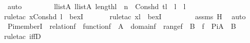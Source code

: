 \begin{isabellebody}
\ auto\ \isanewline
\ \ \ \ \isamarkupfalse%
\ \isamarkupfalse%
\ {\isachardoublequoteopen}{\isasymexists}l{}{\isasymin}list{\isacharparenleft}{\kern0pt}A{\isacharparenright}{\kern0pt}{\isachardot}{\kern0pt}\ {\isasymexists}l{}{\isasymin}list{\isacharparenleft}{\kern0pt}A{\isacharparenright}{\kern0pt}{\isachardot}{\kern0pt}\ length{\isacharparenleft}{\kern0pt}l{}{\isacharparenright}{\kern0pt}\ {\isacharequal}{\kern0pt}\ n\ {\isasymand}\ Cons{\isacharparenleft}{\kern0pt}hd{\isacharcomma}{\kern0pt}\ tl{\isacharparenright}{\kern0pt}\ {\isacharequal}{\kern0pt}\ l{}\ {\isacharat}{\kern0pt}\ l{}{\isachardoublequoteclose}\ \isanewline
\ \ \ \ \ \ \isamarkupfalse%
{\isacharparenleft}{\kern0pt}rule{\isacharunderscore}{\kern0pt}tac\ x{\isacharequal}{\kern0pt}{\isachardoublequoteopen}Cons{\isacharparenleft}{\kern0pt}hd{\isacharcomma}{\kern0pt}\ l{}{\isacharparenright}{\kern0pt}{\isachardoublequoteclose}\ \ bexI{\isacharparenright}{\kern0pt}\isanewline
\ \ \ \ \ \ \isamarkupfalse%
{\isacharparenleft}{\kern0pt}rule{\isacharunderscore}{\kern0pt}tac\ x{\isacharequal}{\kern0pt}l{}\ \ bexI{\isacharparenright}{\kern0pt}\ \isanewline
\ \ \ \ \ \ \isamarkupfalse%
\ assms{}\ H\ \isamarkupfalse%
\ auto\ \isanewline
\ \ \isamarkupfalse%
\isanewline
{}\isamarkupfalse%
%
\endisatagproof
{\isafoldproof}%
%
\isadelimproof
\isanewline
%
\endisadelimproof
\isanewline
{}\isamarkupfalse%
\ Pi{\isacharunderscore}{\kern0pt}memberI\ {\isacharcolon}{\kern0pt}\ {\isachardoublequoteopen}relation{\isacharparenleft}{\kern0pt}f{\isacharparenright}{\kern0pt}\ {\isasymLongrightarrow}\ function{\isacharparenleft}{\kern0pt}f{\isacharparenright}{\kern0pt}\ {\isasymLongrightarrow}\ A\ {\isacharequal}{\kern0pt}\ domain{\isacharparenleft}{\kern0pt}f{\isacharparenright}{\kern0pt}\ {\isasymLongrightarrow}\ range{\isacharparenleft}{\kern0pt}f{\isacharparenright}{\kern0pt}\ {\isasymsubseteq}\ B\ {\isasymLongrightarrow}\ f\ {\isasymin}\ Pi{\isacharparenleft}{\kern0pt}A{\isacharcomma}{\kern0pt}\ {\isasymlambda}{\isacharunderscore}{\kern0pt}{\isachardot}{\kern0pt}\ B{\isacharparenright}{\kern0pt}{\isachardoublequoteclose}\isanewline
%
\isadelimproof
\ \ %
\endisadelimproof
%
\isatagproof
{}\isamarkupfalse%
{\isacharparenleft}{\kern0pt}rule{\isacharunderscore}{\kern0pt}tac\ iffD{}{\isacharparenright}{\kern0pt}\ \isamarkupfalse%

\end{isabellebody}
